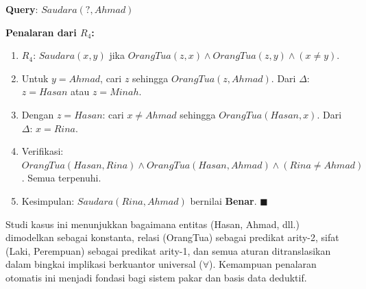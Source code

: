 \begin{contoh}
\textbf{Query}: $Saudara(?, Ahmad)$

\textbf{Penalaran dari $R_4$:}
\begin{enumerate}
    \item $R_4$: $Saudara(x, y)$ jika $OrangTua(z, x) \wedge OrangTua(z, y) \wedge (x \neq y)$.
    \item Untuk $y = Ahmad$, cari $z$ sehingga $OrangTua(z, Ahmad)$. Dari $\Delta$: $z = Hasan$ atau $z = Minah$.
    \item Dengan $z = Hasan$: cari $x \neq Ahmad$ sehingga $OrangTua(Hasan, x)$. Dari $\Delta$: $x = Rina$.
    \item Verifikasi: $OrangTua(Hasan, Rina) \wedge OrangTua(Hasan, Ahmad) \wedge (Rina \neq Ahmad)$. Semua terpenuhi.
    \item Kesimpulan: $Saudara(Rina, Ahmad)$ bernilai \textbf{Benar}. $\blacksquare$
\end{enumerate}
\end{contoh}

\begin{konsep}
Studi kasus ini menunjukkan bagaimana entitas (Hasan, Ahmad, dll.) dimodelkan sebagai konstanta, relasi (OrangTua) sebagai predikat arity-2, sifat (Laki, Perempuan) sebagai predikat arity-1, dan semua aturan ditranslasikan dalam bingkai implikasi berkuantor universal ($\forall$). Kemampuan penalaran otomatis ini menjadi fondasi bagi sistem pakar dan basis data deduktif.
\end{konsep}
